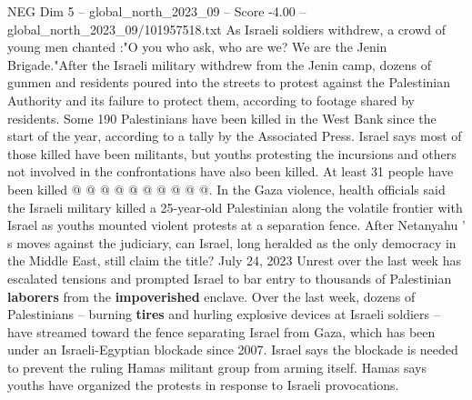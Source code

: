 \begin{textsample}{NEG Dim 5 – global\_north\_2023\_09 – Score -4.00 – global\_north\_2023\_09/101957518.txt}
As Israeli soldiers withdrew, a crowd of young men chanted :"O you who ask, who are we?
We are the Jenin Brigade."After the Israeli military withdrew from the Jenin camp, dozens of gunmen and residents poured into the streets to protest against the Palestinian Authority and its failure to protect them, according to footage shared by residents.
Some 190 Palestinians have been killed in the West Bank since the start of the year, according to a tally by the Associated Press.
Israel says most of those killed have been militants, but youths protesting the incursions and others not involved in the confrontations have also been killed.
At least 31 people have been killed @ @ @ @ @ @ @ @ @ @.
In the Gaza violence, health officials said the Israeli military killed a 25-year-old Palestinian along the volatile frontier with Israel as youths mounted violent protests at a separation fence.
After Netanyahu ' s moves against the judiciary, can Israel, long heralded as the only democracy in the Middle East, still claim the title?
July 24, 2023 Unrest over the last week has escalated tensions and prompted Israel to bar entry to thousands of Palestinian \textbf{laborers} from the \textbf{impoverished} enclave.
Over the last week, dozens of Palestinians -- burning \textbf{tires} and hurling explosive devices at Israeli soldiers -- have streamed toward the fence separating Israel from Gaza, which has been under an Israeli-Egyptian blockade since 2007.
Israel says the blockade is needed to prevent the ruling Hamas militant group from arming itself.
Hamas says youths have organized the protests in response to Israeli provocations.

\end{textsample}
